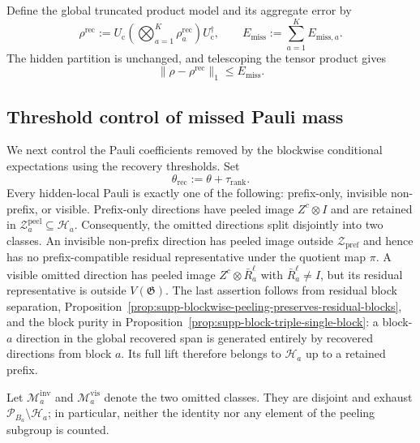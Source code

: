 \documentclass[
  aps,
  prx,
  reprint,
  superscriptaddress,
  amsmath,
  amssymb,
  nofootinbib,
  longbibliography
]{revtex4-2}
\newcommand{\Pc}{\mathcal{P}}
\begin{document}
Define the global truncated product model and its aggregate error by
\begin{equation}
\rho^{\mathrm{rec}}
:=
U_{\mathrm c}
\left(\bigotimes_{a=1}^K\rho_a^{\mathrm{rec}}\right)
U_{\mathrm c}^\dagger,
\qquad
E_{\mathrm{miss}}
:=
\sum_{a=1}^KE_{\mathrm{miss},a}.
\label{eq:supp-global-truncated-product-model}
\end{equation}
The hidden partition is unchanged, and telescoping the tensor product gives
\begin{equation}
\|\rho-\rho^{\mathrm{rec}}\|_1
\le E_{\mathrm{miss}}.
\label{eq:supp-hidden-product-truncation-bound}
\end{equation}

\subsection{Threshold control of missed Pauli mass}
\label{sec:supp-missed-mass-threshold}

We next control the Pauli coefficients removed by the blockwise
conditional expectations using the recovery thresholds.
Set
\begin{equation}
\theta_{\mathrm{rec}}
:=
\theta+\tau_{\mathrm{rank}}.
\end{equation}
Every hidden-local Pauli is exactly one of the following: prefix-only,
invisible non-prefix, or visible.  Prefix-only directions have peeled
image $Z^c\otimes I$ and are retained in
$\mathcal Z_a^{\mathrm{peel}}\subseteq\mathcal H_a$.  Consequently, the
omitted directions split disjointly into two classes.  An invisible
non-prefix direction has peeled image outside
$\mathcal Z_{\mathrm{pref}}$ and hence has no prefix-compatible residual
representative under the quotient map $\pi$.
A visible omitted direction has peeled image
$Z^c\otimes\bar R_a^\ell$ with $\bar R_a^\ell\ne I$, but its residual
representative is outside $V(\mathfrak G)$.  The last assertion follows
from residual block separation,
Proposition~\ref{prop:supp-blockwise-peeling-preserves-residual-blocks},
and the block purity in
Proposition~\ref{prop:supp-block-triple-single-block}: a block-$a$
direction in the global recovered span is generated entirely by recovered
directions from block $a$.  Its full lift therefore belongs to
$\mathcal H_a$ up to a retained prefix.

Let $\mathcal M_a^{\mathrm{inv}}$ and
$\mathcal M_a^{\mathrm{vis}}$ denote the two omitted classes.  They are
disjoint and exhaust
$\Pc_{B_a}\setminus\mathcal H_a$; in particular, neither the identity nor
any element of the peeling subgroup is counted.
\end{document}
